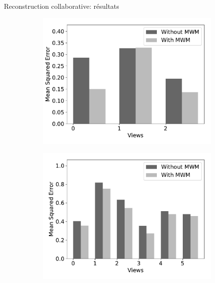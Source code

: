 \documentclass[hyperref={pdfpagelabels=false}]{beamer}
\begin{document}
    \begin{frame}{Reconstruction collaborative: résultats}
        \begin{figure}[!h]
            \centering
            \begin{subfigure}[c]{0.32\textwidth}
                \includegraphics[scale=.21]{mse_wdbc}
            \end{subfigure}
            \begin{subfigure}[c]{0.32\textwidth}
                \includegraphics[scale=.21]{mse_mfeat}
            \end{subfigure}
            \begin{subfigure}[c]{0.32\textwidth}

\end{subfigure}
\end{figure}
\end{frame}
\end{document}
